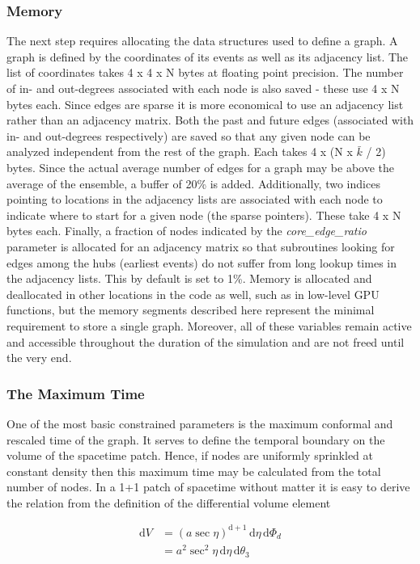 \documentclass[preprint,notitlepage,amsmath,amssymb,floatfix]{revtex4-1}
\begin{document}
\subsubsection{Memory}
The next step requires allocating the data structures used to define a graph.  
A graph is defined by the coordinates of its events as well as its adjacency list.  
The list of coordinates takes 4 x 4 x N bytes at floating point precision.
The number of in- and out-degrees associated with each node is also saved - these use 4 x N bytes each.
Since edges are sparse it is more economical to use an adjacency list rather than an adjacency matrix.
Both the past and future edges (associated with in- and out-degrees respectively) are saved so that any given node can be analyzed independent from the rest of the graph.  
Each takes 4 x (N x $\bar k$ / 2) bytes.  
Since the actual average number of edges for a graph may be above the average of the ensemble, a buffer of 20\% is added.
Additionally, two indices pointing to locations in the adjacency lists are associated with each node to indicate where to start for a given node (the sparse pointers).
These take 4 x N bytes each.
Finally, a fraction of nodes indicated by the \textit{core\_edge\_ratio} parameter is allocated for an adjacency matrix so that subroutines looking for edges among the hubs (earliest events) do not suffer from long lookup times in the adjacency lists.  
This by default is set to 1\%.
Memory is allocated and deallocated in other locations in the code as well, such as in low-level GPU functions, but the memory segments described here represent the minimal requirement to store a single graph.
Moreover, all of these variables remain active and accessible throughout the duration of the simulation and are not freed until the very end.
\subsubsection{The Maximum Time}
One of the most basic constrained parameters is the maximum conformal and rescaled time of the graph.
It serves to define the temporal boundary on the volume of the spacetime patch.  
Hence, if nodes are uniformly sprinkled at constant density then this maximum time may be calculated from the total number of nodes.
In a 1+1 patch of spacetime without matter it is easy to derive the relation from the definition of the differential volume element

\begin{equation}
\begin{split}
\mathrm{d}V &= \left(a\sec\eta\right)^{\mathrm{d}+1}\,\mathrm{d}\eta\,\mathrm{d}\Phi_d \\
   &= a^2\sec^2\eta\,\mathrm{d}\eta\,\mathrm{d}\theta_3
\end{split}
\end{equation}
\end{document}
